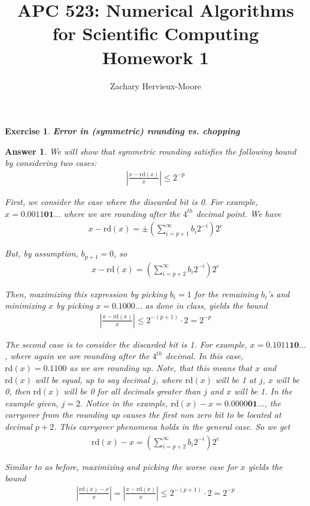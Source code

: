 \documentclass[12pt]{article}
\title{APC 523: Numerical Algorithms for Scientific Computing \\ Homework 1}
\author{Zachary Hervieux-Moore}
\date{\displaydate{date}}
\theoremstyle{colon}
\newtheorem{exercise}{Exercise}
\newtheorem*{answer}{Answer}
\begin{document}
\maketitle

\clearpage

\begin{exercise}
  \textbf{Error in (symmetric) rounding vs. chopping}
\end{exercise}

\begin{answer}
  We will show that symmetric rounding satisfies the following bound by considering two cases:
  \begin{gather*}
    \left\lvert \frac{x - \text{rd}(x)}{x} \right\rvert  \leq 2^{-p}
  \end{gather*}

  First, we consider the case where the discarded bit is 0. For example, $x = 0.0011\textbf{01...}$ where we are rounding after the $4^{th}$ decimal point. We have
  \begin{gather*}
    x - \text{rd}(x) = \pm \left( \sum_{i=p+1}^\infty b_i 2^{-i} \right) 2^e
  \end{gather*}

  But, by assumption, $b_{p+1} = 0$, so
  \begin{gather*}
    x - \text{rd}(x) = \left( \sum_{i=p+2}^\infty b_i 2^{-i} \right) 2^e
  \end{gather*}

  Then, maximizing this expression by picking $b_i = 1$ for the remaining $b_i$'s and minimizing $x$ by picking $x = 0.1000...$ as done in class, yields the bound
  \begin{gather*}
    \left\lvert \frac{x - \text{rd}(x)}{x} \right\rvert  \leq 2^{-(p+1)} \cdot 2 = 2^{-p}
  \end{gather*}

  The second case is to consider the discarded bit is 1. For example, $x = 0.1011\textbf{10...}$, where again we are rounding after the $4^{th}$ decimal. In this case, $\text{rd}(x) = 0.1100$ as we are rounding up. Note, that this means that $x$ and $\text{rd}(x)$ will be equal, up to say decimal $j$, where $\text{rd}(x)$ will be 1 at $j$, $x$ will be 0, then $\text{rd}(x)$ will be 0 for all decimals greater than $j$ and $x$ will be 1. In the example given, $j=2$. Notice in the example, $\text{rd}(x) - x = 0.0000\textbf{01...}$, the carryover from the rounding up causes the first non zero bit to be located at decimal $p + 2$. This carryover phenomena holds in the general case. So we get
  \begin{gather*}
    \text{rd}(x) - x = \left( \sum_{i=p+2}^\infty b_i 2^{-i} \right) 2^e
  \end{gather*}

  Similar to as before, maximizing and picking the worse case for $x$ yields the bound
  \begin{gather*}
    \left\lvert \frac{\text{rd}(x)- x}{x} \right\rvert = \left\lvert \frac{x - \text{rd}(x)}{x} \right\rvert  \leq 2^{-(p+1)} \cdot 2 = 2^{-p}
  \end{gather*}
\end{answer}
\end{document}
